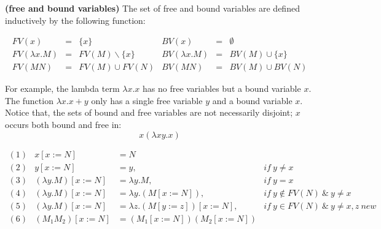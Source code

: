 \begin{def1}
\normalfont \textbf{(free and bound variables)} The set of free and bound variables are defined inductively by the following function:
\end{def1}

\begin{equation*}\label{eq:fv}
\begin{array}{lcllcl}
FV(x)           & = & \{x\}             & BV(x)           &=& \emptyset\\
FV(\lambda x.M) & = & FV(M)\backslash \{x\} & BV(\lambda x.M) &=& BV(M)\cup \{x\}\\
FV(MN)          & = & FV(M)\cup FV(N) & BV(MN)          &=& BV(M)\cup BV(N)
\end{array}
\end{equation*}


For example, the lambda term $\lambda x.x$ has no free variables but a bound variable $x$. The function $\lambda x.x+y$ only has a single free variable $y$ and a bound variable $x$. 
Notice that, the sets of bound and free variables are not necessarily disjoint; $x$ occurs both bound and free in:
\begin{equation*}
x(\lambda xy.x)
\end{equation*}

\begin{equation*}
\begin{array}{lrll}
(1)&x[x:=N]&=N & ~\\
(2)&y[x:=N]&=y,& if\ y\neq x\\
(3)&(\lambda y.M)[x:=N]&=\lambda y.M,& if\ y=x\\
(4)&(\lambda y.M)[x:=N]&=\lambda y.(M[x:=N]),& if\ y\notin FV(N)\ \& \ y\neq x\\
(5)&(\lambda y.M)[x:=N]&=\lambda z.(M[y:=z])[x:=N],& if\ y\in FV(N)\ \& \ y\neq x,z\  new\\
(6)&(M_1M_2)[x:=N] &= (M_1[x:=N])(M_2[x:=N])&
\end{array}
\end{equation*}

